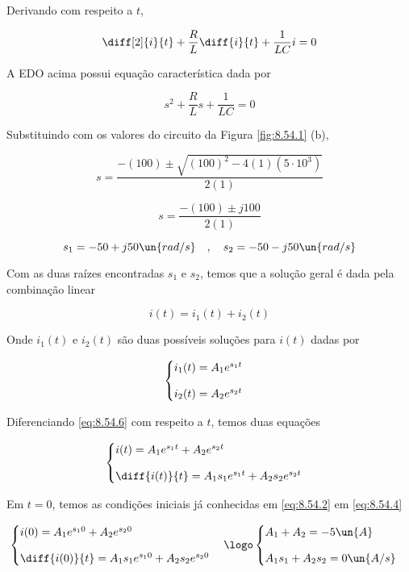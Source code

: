 Derivando com respeito a $t$,   

\[ \diff[2]{i}{t} + \frac{R}{L}\diff{i}{t} + \frac{1}{LC}i = 0 \]

A EDO acima possui equação característica dada por 

\begin{equation}\label{eq:8.54.5}
    s^2 + \frac{R}{L}s + \frac{1}{LC} = 0
\end{equation}

Substituindo com os valores do circuito da Figura \ref*{fig:8.54.1} (b),

\[ s = \frac{-(100) \pm \sqrt{(100)^2 - 4(1)(5 \cdot 10^{3})}}{2(1)} \]

\[ s = \frac{-(100) \pm j100}{2(1)} \]

\[ s_1 = -50 + j50 \un{rad/s} \quad , \quad s_2 = -50 - j50 \un{rad/s} \]

Com as duas raízes encontradas $s_1$ e $s_2$, temos que a solução geral é dada pela combinação linear

\begin{equation}\label{eq:8.54.6}
    i(t) = i_1(t) + i_2(t)
\end{equation}

Onde $i_1(t)$ e $i_2(t)$ são duas possíveis soluções para $i(t)$ dadas por  

\[ \begin{cases}
        i_1(t) = A_1e^{s_1t}  & \\
        \noalign{\vskip9pt}
        i_2(t) = A_2e^{s_2t}
    \end{cases}
\]

Diferenciando \eqref{eq:8.54.6} com respeito a $t$, temos duas equações

\[ \begin{cases}
        i(t) = A_1e^{s_1t} + A_2e^{s_2t} & \\
        \noalign{\vskip9pt}
        \diff{i(t)}{t} = A_1s_1e^{s_1t} + A_2s_2e^{s_2t}
    \end{cases}
\]

Em $t=0$, temos as condições iniciais já conhecidas em \eqref{eq:8.54.2} em \eqref{eq:8.54.4}

\[ \begin{cases}
        i(0) = A_1e^{s_10} + A_2e^{s_20} & \\
        \noalign{\vskip9pt}
        \diff{i(0)}{t} = A_1s_1e^{s_10} + A_2s_2e^{s_20}
    \end{cases}
    \logo
    \begin{cases}
        A_1 + A_2 = -5 \un{A} & \\
        \noalign{\vskip9pt}
        A_1s_1 + A_2s_2 = 0 \un{A/s}
    \end{cases}
\]

